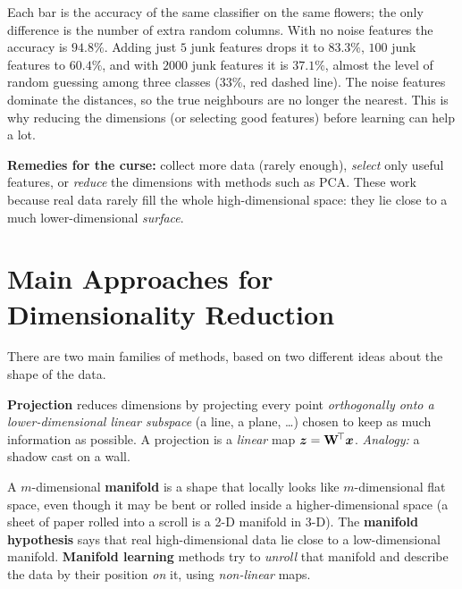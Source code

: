 \begin{explain}
Each bar is the accuracy of the same classifier on the same flowers; the only difference is the number of extra random columns. With no noise features the accuracy is $94.8\%$. Adding just $5$ junk features drops it to $83.3\%$, $100$ junk features to $60.4\%$, and with $2000$ junk features it is $37.1\%$, almost the level of random guessing among three classes ($33\%$, red dashed line). The noise features dominate the distances, so the true neighbours are no longer the nearest. This is why reducing the dimensions (or selecting good features) before learning can help a lot.
\end{explain}

\begin{keyidea}
\textbf{Remedies for the curse:} collect more data (rarely enough), \emph{select} only useful features, or \emph{reduce} the dimensions with methods such as PCA. These work because real data rarely fill the whole high-dimensional space: they lie close to a much lower-dimensional \emph{surface}.
\end{keyidea}

\section{Main Approaches for Dimensionality Reduction}

There are two main families of methods, based on two different ideas about the shape of the data.

\begin{definition}[: Projection]
\textbf{Projection} reduces dimensions by projecting every point \emph{orthogonally onto a lower-dimensional linear subspace} (a line, a plane, \dots) chosen to keep as much information as possible. A projection is a \emph{linear} map $\boldsymbol{z}=\mathbf W^{\!\top}\boldsymbol{x}$. \emph{Analogy:} a shadow cast on a wall.
\end{definition}

\begin{definition}
A $m$-dimensional \textbf{manifold} is a shape that locally looks like $m$-dimensional flat space, even though it may be bent or rolled inside a higher-dimensional space (a sheet of paper rolled into a scroll is a 2-D manifold in 3-D). The \textbf{manifold hypothesis} says that real high-dimensional data lie close to a low-dimensional manifold. \textbf{Manifold learning} methods try to \emph{unroll} that manifold and describe the data by their position \emph{on} it, using \emph{non-linear} maps.
\end{definition}

